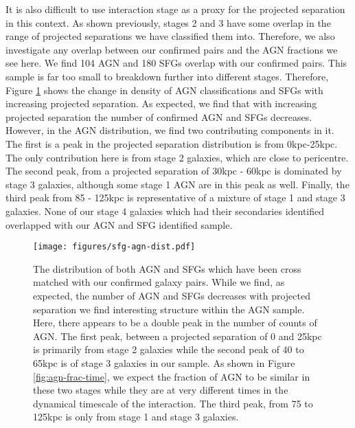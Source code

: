 \documentclass[fleqn,usenatbib]{mnras}
\begin{document}
It is also difficult to use interaction stage as a proxy for the projected separation in this context. As shown previously, stages 2 and 3 have some overlap in the range of projected separations we have classified them into. Therefore, we also investigate any overlap between our confirmed pairs and the AGN fractions we see here. We find 104 AGN and 180 SFGs overlap with our confirmed pairs. This sample is far too small to breakdown further into different stages. Therefore, Figure \ref{fig:sfg-agn-proj} shows the change in density of AGN classifications and SFGs with increasing projected separation. As expected, we find that with increasing projected separation the number of confirmed AGN and SFGs decreases. However, in the AGN distribution, we find two contributing components in it. The first is a peak in the projected separation distribution is from 0kpc-25kpc. The only contribution here is from stage 2 galaxies, which are close to pericentre. The second peak, from a projected separation of 30kpc - 60kpc is dominated by stage 3 galaxies, although some stage 1 AGN are in this peak as well. Finally, the third peak from 85 - 125kpc is representative of a mixture of stage 1 and stage 3 galaxies. None of our stage 4 galaxies which had their secondaries identified overlapped with our AGN and SFG identified sample.

\begin{figure}
    \centering
    \texttt{[image: figures/sfg-agn-dist.pdf]}
    \caption{The distribution of both AGN and SFGs which have been cross matched with our confirmed galaxy pairs. While we find, as expected, the number of AGN and SFGs decreases with projected separation we find interesting structure within the AGN sample. Here, there appears to be a double peak in the number of counts of AGN. The first peak, between a projected separation of 0 and 25kpc is primarily from stage 2 galaxies while the second peak of 40 to 65kpc is of stage 3 galaxies in our sample. As shown in Figure \ref{fig:agn-frac-time}, we expect the fraction of AGN to be similar in these two stages while they are at very different times in the dynamical timescale of the interaction. The third peak, from 75 to 125kpc is only from stage 1 and stage 3 galaxies.}
    \label{fig:sfg-agn-proj}
\end{figure}
\end{document}
